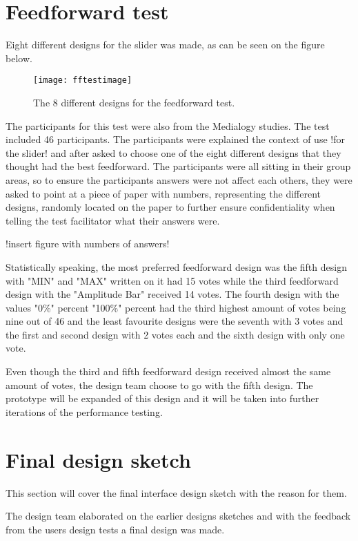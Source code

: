 \section{Feedforward test}
Eight different designs for the slider was made, as can be seen on the figure below.

\begin{figure}[!h] 
\centering
\texttt{[image: fftestimage]}
\caption{\label{fig:fftestimage} The 8 different designs for the feedforward test.}
\end{figure}

The participants for this test were also from the Medialogy studies. The test included 46 participants. The participants were explained the context of use !for the slider! and after asked to choose one of the eight different designs that they thought had the best feedforward. The participants were all sitting in their group areas, so to ensure the participants answers were not affect each others, they were asked to point at a piece of paper with numbers, representing the different designs, randomly located on the paper to further ensure confidentiality when telling the test facilitator what their answers were. 

!insert figure with numbers of answers!

Statistically speaking, the most preferred feedforward design was the fifth design with "MIN" and "MAX" written on it had 15 votes while the third feedforward design with the "Amplitude Bar"  received 14 votes. The fourth design with the values "0\%" percent "100\%" percent had the third highest amount of votes being nine out of 46 and the least favourite designs were the seventh with 3 votes and the first and second design with 2 votes each and the sixth design with only one vote. 

Even though the third and fifth feedforward design received almost the same amount of votes, the design team choose to go with the fifth design. The prototype will be expanded of this design and it will be taken into further iterations of the performance testing. 


\section{Final design sketch}
This section will cover the final interface design sketch with the reason for them.  

The design team elaborated on the earlier designs sketches and with the feedback from the users design tests a final design was made.

